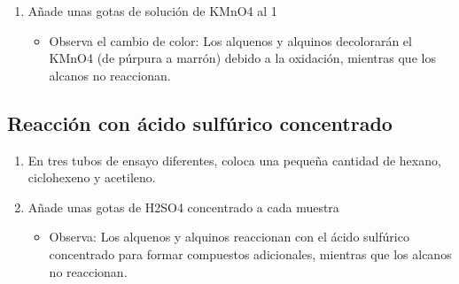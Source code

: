     \begin{enumerate}
        \item Añade unas gotas de solución de KMnO4 al 1%
        \begin{itemize}
            \item Observa el cambio de color: Los alquenos y alquinos decolorarán el KMnO4 (de púrpura a marrón) debido a la oxidación, mientras que los alcanos no reaccionan.
        \end{itemize}
    \end{enumerate}
    
\subsection{Reacción con ácido sulfúrico concentrado}

    \begin{enumerate}
        \item En tres tubos de ensayo diferentes, coloca una pequeña cantidad de hexano, ciclohexeno y acetileno.
        \item Añade unas gotas de H2SO4 concentrado a cada muestra
        \begin{itemize}
            \item Observa: Los alquenos y alquinos reaccionan con el ácido sulfúrico concentrado para formar compuestos adicionales, mientras que los alcanos no reaccionan.
        \end{itemize}
    \end{enumerate}